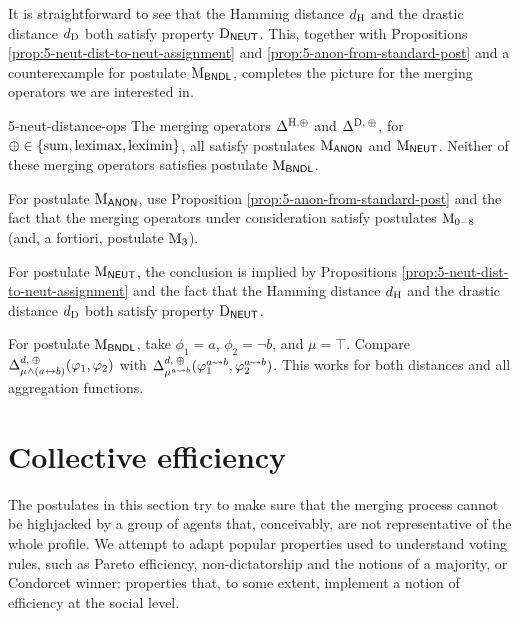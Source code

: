 It is straightforward to see that the Hamming distance $d_{\operatorname{H}}$ and 
the drastic distance $d_{\operatorname{D}}$ both satisfy property $\mathrm{D}_{\mathsf{NEUT}}$.
This, together with Propositions \ref{prop:5-neut-dist-to-neut-assignment} 
and \ref{prop:5-anon-from-standard-post} and a counterexample for postulate 
$\mathrm{M}_{\mathsf{BNDL}}$, completes the picture for the merging operators we are interested in.

\begin{prp}{}{5-neut-distance-ops}
	The merging operators $\Delta^{{\operatorname{H}},{\operatorname{\oplus}}}$	and $\Delta^{{\operatorname{D}},\:{\operatorname{\oplus}}}$, 
	for ${\operatorname{\oplus}}\in\{{\operatorname{sum}},{\operatorname{leximax}},{\operatorname{leximin}}\}$, 
	all satisfy postulates $\mathrm{M}_{\mathsf{ANON}}$ and $\mathrm{M}_{\mathsf{NEUT}}$.
	Neither of these merging operators
	satisfies postulate $\mathrm{M}_{\mathsf{BNDL}}$.
\end{prp}
\begin{prf*}{}{}%
	For postulate $\mathrm{M}_{\mathsf{ANON}}$, use Proposition \ref{prop:5-anon-from-standard-post}
	and the fact that the merging operators under consideration satisfy postulates $\mathrm{M}_{0-8}$
	(and, a fortiori, postulate $\mathrm{M}_{3}$).

	For postulate $\mathrm{M}_{\mathsf{NEUT}}$, the conclusion is implied by Propositions \ref{prop:5-neut-dist-to-neut-assignment} 
	and the fact that the Hamming distance $d_{\operatorname{H}}$ and 
	the drastic distance $d_{\operatorname{D}}$ both satisfy property $\mathrm{D}_{\mathsf{NEUT}}$.

	For postulate $\mathrm{M}_{\mathsf{BNDL}}$,
	take $\phi_1=a$, $\phi_2=\lnot b$, and $\mu=\top$.
	Compare $\Delta^{d,\:{\operatorname{\oplus}}}_{\mu\land(a\leftrightarrow b)}(\varphi_1,\varphi_2)$ with 
	$\Delta^{d,\:{\operatorname{\oplus}}}_{\mu^{a\rightsquigarrow b}}(\varphi_1^{a\rightsquigarrow b}, \varphi_2^{a\rightsquigarrow b})$. 
	This works for both distances and all aggregation functions.
\end{prf*}

























\section{Collective efficiency}\label{sec:5-evenhandedness}
The postulates in this section try to make sure that the merging process
cannot be highjacked by a group of agents that, 
conceivably, are not representative of the whole profile.
We attempt to adapt popular properties 
used to understand voting rules, such as 
Pareto efficiency, non-dictatorship and 
the notions of a majority, or Condorcet winner:
properties that, to some extent, 
implement a notion of efficiency at the social level.

